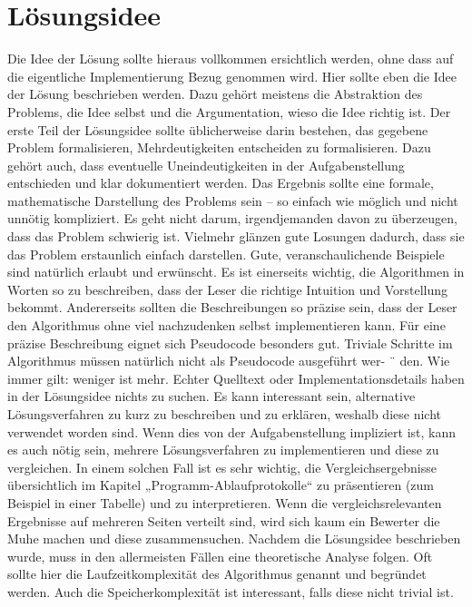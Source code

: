 \documentclass[a4paper,10pt,ngerman]{scrartcl}
\begin{document}
	\section{Lösungsidee}\label{sec:losungsidee}
	Die Idee der Lösung sollte hieraus vollkommen ersichtlich werden, ohne dass auf die eigentliche Implementierung Bezug genommen wird.
	Hier sollte eben die Idee der Lösung beschrieben werden.
	Dazu gehört meistens die Abstraktion des Problems, die Idee selbst und die Argumentation, wieso die Idee richtig ist.
	Der erste Teil der Lösungsidee sollte üblicherweise darin bestehen, das gegebene Problem formalisieren, Mehrdeutigkeiten entscheiden zu formalisieren.
	Dazu gehört auch, dass eventuelle Uneindeutigkeiten in der Aufgabenstellung entschieden und klar dokumentiert werden.
	Das Ergebnis sollte eine formale, mathematische Darstellung des Problems sein – so einfach wie möglich und nicht unnötig kompliziert.
	Es geht nicht darum, irgendjemanden davon zu überzeugen, dass das Problem schwierig ist.
	Vielmehr glänzen gute Losungen dadurch, dass sie das Problem erstaunlich einfach darstellen.
	Gute, veranschaulichende Beispiele sind natürlich erlaubt und erwünscht.
	Es ist einerseits wichtig, die Algorithmen in Worten so zu beschreiben, dass der Leser die richtige Intuition und Vorstellung bekommt.
	Andererseits sollten die Beschreibungen so präzise sein, dass der Leser den Algorithmus ohne viel nachzudenken selbst implementieren kann.
	Für eine präzise Beschreibung eignet sich Pseudocode besonders gut.
	Triviale Schritte im Algorithmus müssen natürlich nicht als Pseudocode ausgeführt wer- ¨ den.
	Wie immer gilt: weniger ist mehr.
	Echter Quelltext oder Implementationsdetails haben in der Lösungsidee nichts zu suchen.
	Es kann interessant sein, alternative Lösungsverfahren zu kurz zu beschreiben und zu erklären, weshalb diese nicht verwendet worden sind.
	Wenn dies von der Aufgabenstellung impliziert ist, kann es auch nötig sein, mehrere Lösungsverfahren zu implementieren und diese zu vergleichen.
	In einem solchen Fall ist es sehr wichtig, die Vergleichsergebnisse übersichtlich im Kapitel „Programm-Ablaufprotokolle“ zu präsentieren (zum Beispiel in einer Tabelle) und zu interpretieren.
	Wenn die vergleichsrelevanten Ergebnisse auf mehreren Seiten verteilt sind, wird sich kaum ein Bewerter die Muhe machen und diese zusammensuchen.
	Nachdem die Lösungsidee beschrieben wurde, muss in den allermeisten Fällen eine theoretische Analyse folgen.
	Oft sollte hier die Laufzeitkomplexität des Algorithmus genannt und begründet werden.
	Auch die Speicherkomplexität ist interessant, falls diese nicht trivial ist.
\end{document}
